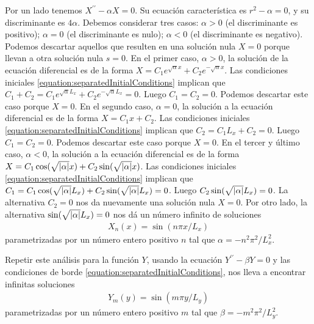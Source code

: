 \documentclass{article}
\DeclarePairedDelimiter\abs{\lvert}{\rvert}%
\begin{document}
  Por un lado tenemos \(X^{\prime\prime} - \alpha X = 0\).
  Su ecuación característica es \(r^2 - \alpha = 0\), y su discriminante es \(4 \alpha\).
  Debemos considerar tres casos: \(\alpha > 0\) (el discriminante es positivo); \(\alpha = 0\) (el discriminante es nulo); \(\alpha < 0\) (el discriminante es negativo).
  Podemos descartar aquellos que resulten en una solución nula \(X = 0\) porque llevan a otra solución nula \(s = 0\).
  En el primer caso, \(\alpha > 0\), la solución de la ecuación diferencial es de la forma \(X = C_1 e^{\sqrt{\alpha} x} + C_2 e^{- \sqrt{\alpha} x}\).
  Las condiciones iniciales \eqref{equation:separatedInitialConditions} implican que \(C_1 + C_2 = C_1 e^{\sqrt{\alpha} L_x} + C_2 e^{- \sqrt{\alpha} L_x} = 0\).
  Luego \(C_1 = C_2 = 0\).
  Podemos descartar este caso porque \(X = 0\).
  En el segundo caso, \(\alpha = 0\), la solución a la ecuación diferencial es de la forma \(X = C_1 x + C_2\).
  Las condiciones iniciales \eqref{equation:separatedInitialConditions} implican que \(C_2 = C_1 L_x + C_2 = 0\).
  Luego \(C_1 = C_2 = 0\).
  Podemos descartar este caso porque \(X = 0\).
  En el tercer y último caso, \(\alpha < 0\), la solución a la ecuación diferencial es de la forma \(X = C_1 \cos(\sqrt{\abs{\alpha}} x) + C_2 \sin(\sqrt{\abs{\alpha}} x)\).
  Las condiciones iniciales \eqref{equation:separatedInitialConditions} implican que \(C_1 = C_1 \cos(\sqrt{\abs{\alpha}} L_x) + C_2 \sin(\sqrt{\abs{\alpha}} L_x) = 0\).
  Luego \(C_2 \sin(\sqrt{\abs{\alpha}} L_x) = 0\).
  La alternativa \(C_2 = 0\) nos da nuevamente una solución nula \(X = 0\).
  Por otro lado, la alternativa \(\sin(\sqrt{\abs{\alpha}} L_x) = 0\) nos dá un número infinito de soluciones
  \begin{align}
    X_n(x) = \sin(n \pi x / L_x)
  \end{align}
  parametrizadas por un número entero positivo \(n\) tal que \(\alpha = - n^2 \pi^2 / L_x^2\).

  Repetir este análisis para la función \(Y\), usando la ecuación \(Y^{\prime\prime} - \beta Y = 0\) y las condiciones de borde \eqref{equation:separatedInitialConditions}, nos lleva a encontrar infinitas soluciones
  \begin{align}
    Y_m(y) = \sin(m \pi y / L_y)
  \end{align}
  parametrizadas por un número entero positivo \(m\) tal que \(\beta = - m^2 \pi^2 / L_y^2\).
\end{document}
